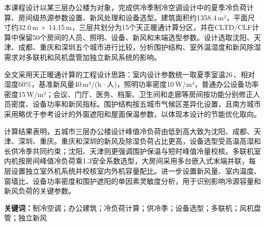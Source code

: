 
本课程设计以某三层办公楼为对象，完成供冷季制冷空调设计中的夏季冷负荷计算、房间级热源参数设置、新风处理和设备选型。建筑面积约1358.4\,m²，平面尺寸约32.0\,m $\times$ 14.15\,m，三层共划分为15个天正暖通计算分区，并在CLTD/CLF计算中保留50个房间的人员、照明、设备、新风和末端选型参数。设计选取沈阳、天津、成都、重庆和深圳五个城市进行比较，分析围护结构、室外温湿度和新风除湿需求对多联机和风机盘管加独立新风系统的影响。

全文采用天正暖通计算的工程设计思路：室内设计参数统一取夏季室温26\,\textcelsius、相对湿度60\%，基准新风量40\,m³/(h·人)，照明功率密度10\,W/m²，普通办公设备功率密度15\,W/m²；会议、门厅、医务、档案、卫生间和走廊等房间按功能分别修正人员密度、设备功率和新风指标。围护结构按五城市气候区差异化设置，且南方城市采用略优于参考设计的外窗遮阳和屋面保温参数，以体现本设计的节能优化取向。

计算结果表明，五城市三层办公楼设计峰值冷负荷由低到高大致为沈阳、成都、天津、深圳、重庆。重庆和深圳的新风及除湿负荷占比更高，设备选型受高温高湿和长供冷季共同约束；沈阳、天津则更强调围护保温与短时峰值冷量校核。多联机室内机按房间峰值冷负荷乘1.3安全系数选型，大房间采用多台嵌入式末端并联，每层设置独立室外机系统并校核室内外机容量配比。进一步设置新风量、室内温度、窗墙比、设备功率密度和围护遮阳的单因素灵敏度分析，用于识别影响冷源容量和新风负荷的关键参数。

\smallskip
\noindent\textbf{关键词：}制冷空调；办公建筑；冷负荷计算；供冷季；设备选型；多联机；风机盘管；独立新风

